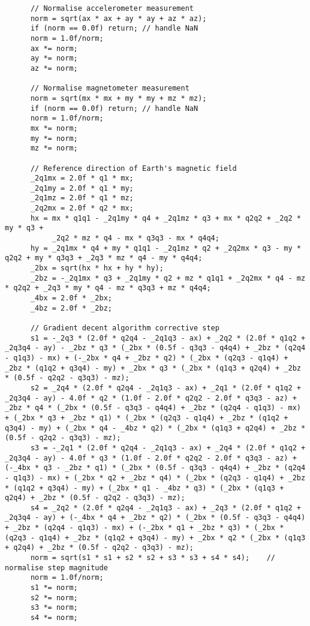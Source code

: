 \begin{lstlisting}
	  // Normalise accelerometer measurement
	  norm = sqrt(ax * ax + ay * ay + az * az);
	  if (norm == 0.0f) return; // handle NaN
	  norm = 1.0f/norm;
	  ax *= norm;
	  ay *= norm;
	  az *= norm;

	  // Normalise magnetometer measurement
	  norm = sqrt(mx * mx + my * my + mz * mz);
	  if (norm == 0.0f) return; // handle NaN
	  norm = 1.0f/norm;
	  mx *= norm;
	  my *= norm;
	  mz *= norm;

	  // Reference direction of Earth's magnetic field
	  _2q1mx = 2.0f * q1 * mx;
	  _2q1my = 2.0f * q1 * my;
	  _2q1mz = 2.0f * q1 * mz;
	  _2q2mx = 2.0f * q2 * mx;
	  hx = mx * q1q1 - _2q1my * q4 + _2q1mz * q3 + mx * q2q2 + _2q2 * my * q3 +
	       _2q2 * mz * q4 - mx * q3q3 - mx * q4q4;
	  hy = _2q1mx * q4 + my * q1q1 - _2q1mz * q2 + _2q2mx * q3 - my * q2q2 + my * q3q3 + _2q3 * mz * q4 - my * q4q4;
	  _2bx = sqrt(hx * hx + hy * hy);
	  _2bz = -_2q1mx * q3 + _2q1my * q2 + mz * q1q1 + _2q2mx * q4 - mz * q2q2 + _2q3 * my * q4 - mz * q3q3 + mz * q4q4;
	  _4bx = 2.0f * _2bx;
	  _4bz = 2.0f * _2bz;

	  // Gradient decent algorithm corrective step
	  s1 = -_2q3 * (2.0f * q2q4 - _2q1q3 - ax) + _2q2 * (2.0f * q1q2 + _2q3q4 - ay) - _2bz * q3 * (_2bx * (0.5f - q3q3 - q4q4) + _2bz * (q2q4 - q1q3) - mx) + (-_2bx * q4 + _2bz * q2) * (_2bx * (q2q3 - q1q4) + _2bz * (q1q2 + q3q4) - my) + _2bx * q3 * (_2bx * (q1q3 + q2q4) + _2bz * (0.5f - q2q2 - q3q3) - mz);
	  s2 = _2q4 * (2.0f * q2q4 - _2q1q3 - ax) + _2q1 * (2.0f * q1q2 + _2q3q4 - ay) - 4.0f * q2 * (1.0f - 2.0f * q2q2 - 2.0f * q3q3 - az) + _2bz * q4 * (_2bx * (0.5f - q3q3 - q4q4) + _2bz * (q2q4 - q1q3) - mx) + (_2bx * q3 + _2bz * q1) * (_2bx * (q2q3 - q1q4) + _2bz * (q1q2 + q3q4) - my) + (_2bx * q4 - _4bz * q2) * (_2bx * (q1q3 + q2q4) + _2bz * (0.5f - q2q2 - q3q3) - mz);
	  s3 = -_2q1 * (2.0f * q2q4 - _2q1q3 - ax) + _2q4 * (2.0f * q1q2 + _2q3q4 - ay) - 4.0f * q3 * (1.0f - 2.0f * q2q2 - 2.0f * q3q3 - az) + (-_4bx * q3 - _2bz * q1) * (_2bx * (0.5f - q3q3 - q4q4) + _2bz * (q2q4 - q1q3) - mx) + (_2bx * q2 + _2bz * q4) * (_2bx * (q2q3 - q1q4) + _2bz * (q1q2 + q3q4) - my) + (_2bx * q1 - _4bz * q3) * (_2bx * (q1q3 + q2q4) + _2bz * (0.5f - q2q2 - q3q3) - mz);
	  s4 = _2q2 * (2.0f * q2q4 - _2q1q3 - ax) + _2q3 * (2.0f * q1q2 + _2q3q4 - ay) + (-_4bx * q4 + _2bz * q2) * (_2bx * (0.5f - q3q3 - q4q4) + _2bz * (q2q4 - q1q3) - mx) + (-_2bx * q1 + _2bz * q3) * (_2bx * (q2q3 - q1q4) + _2bz * (q1q2 + q3q4) - my) + _2bx * q2 * (_2bx * (q1q3 + q2q4) + _2bz * (0.5f - q2q2 - q3q3) - mz);
	  norm = sqrt(s1 * s1 + s2 * s2 + s3 * s3 + s4 * s4);    // normalise step magnitude
	  norm = 1.0f/norm;
	  s1 *= norm;
	  s2 *= norm;
	  s3 *= norm;
	  s4 *= norm;


\end{lstlisting}
